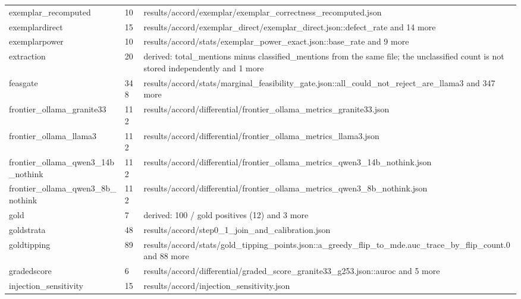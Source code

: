 \begin{longtable}{@{}p{1.6in}p{0.6in}p{3.6in}@{}}
exemplar\_recomputed & 10 & results/\allowbreak{}accord/\allowbreak{}exemplar/\allowbreak{}exemplar\_correctness\_recomputed.\allowbreak{}json\\
exemplardirect & 15 & results/\allowbreak{}accord/\allowbreak{}exemplar\_direct/\allowbreak{}exemplar\_direct.\allowbreak{}json::defect\_rate and 14 more\\
exemplarpower & 10 & results/\allowbreak{}accord/\allowbreak{}stats/\allowbreak{}exemplar\_power\_exact.\allowbreak{}json::base\_rate and 9 more\\
extraction & 20 & derived: total\_mentions minus classified\_mentions from the same file; the unclassified count is not stored independently and 1 more\\
feasgate & 348 & results/\allowbreak{}accord/\allowbreak{}stats/\allowbreak{}marginal\_feasibility\_gate.\allowbreak{}json::all\_could\_not\_reject\_are\_llama3 and 347 more\\
frontier\_ollama\_granite33 & 112 & results/\allowbreak{}accord/\allowbreak{}differential/\allowbreak{}frontier\_ollama\_metrics\_granite33.\allowbreak{}json\\
frontier\_ollama\_llama3 & 112 & results/\allowbreak{}accord/\allowbreak{}differential/\allowbreak{}frontier\_ollama\_metrics\_llama3.\allowbreak{}json\\
frontier\_ollama\_qwen3\_14b\_nothink & 112 & results/\allowbreak{}accord/\allowbreak{}differential/\allowbreak{}frontier\_ollama\_metrics\_qwen3\_14b\_nothink.\allowbreak{}json\\
frontier\_ollama\_qwen3\_8b\_nothink & 112 & results/\allowbreak{}accord/\allowbreak{}differential/\allowbreak{}frontier\_ollama\_metrics\_qwen3\_8b\_nothink.\allowbreak{}json\\
gold & 7 & derived: 100 /\allowbreak{} gold positives (12) and 3 more\\
goldstrata & 48 & results/\allowbreak{}accord/\allowbreak{}step0\_1\_join\_and\_calibration.\allowbreak{}json\\
goldtipping & 89 & results/\allowbreak{}accord/\allowbreak{}stats/\allowbreak{}gold\_tipping\_points.\allowbreak{}json::a\_greedy\_flip\_to\_mde.\allowbreak{}auc\_trace\_by\_flip\_count.\allowbreak{}0 and 88 more\\
gradedscore & 6 & results/\allowbreak{}accord/\allowbreak{}differential/\allowbreak{}graded\_score\_granite33\_g253.\allowbreak{}json::auroc and 5 more\\
injection\_sensitivity & 15 & results/\allowbreak{}accord/\allowbreak{}injection\_sensitivity.\allowbreak{}json\\

\end{longtable}
